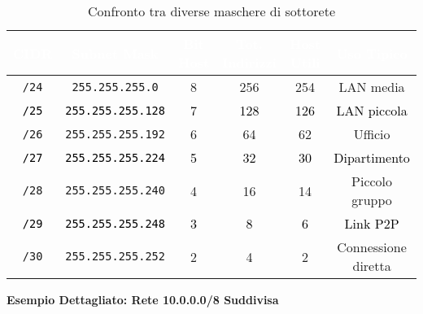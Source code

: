 \begin{table}[H]
\centering
\begin{tabular}{|c|c|c|c|c|c|}
\hline
\rowcolor{bg_custom}
\textcolor{white}{\textbf{CIDR}} & \textcolor{white}{\textbf{Subnet Mask}} & \textcolor{white}{\textbf{Bit Host}} & \textcolor{white}{\textbf{Tot. Indirizzi}} & \textcolor{white}{\textbf{Host Utili}} & \textcolor{white}{\textbf{Uso Tipico}} \\
\hline
\texttt{/24} & \texttt{255.255.255.0} & 8 & 256 & 254 & LAN media \\
\hline
\rowcolor{retecolor!20}
\textcolor{black}{\texttt{/25}} & \textcolor{black}{\texttt{255.255.255.128}} & \textcolor{black}{7} & \textcolor{black}{128} & \textcolor{black}{126} & \textcolor{black}{LAN piccola} \\
\hline
\texttt{/26} & \texttt{255.255.255.192} & 6 & 64 & 62 & Ufficio \\
\hline
\rowcolor{hostcolor!20}
\textcolor{black}{\texttt{/27}} & \textcolor{black}{\texttt{255.255.255.224}} & \textcolor{black}{5} & \textcolor{black}{32} & \textcolor{black}{30} & \textcolor{black}{Dipartimento} \\
\hline
\texttt{/28} & \texttt{255.255.255.240} & 4 & 16 & 14 & Piccolo gruppo \\
\hline
\rowcolor{retecolor!20}
\textcolor{black}{\texttt{/29}} & \textcolor{black}{\texttt{255.255.255.248}} & \textcolor{black}{3} & \textcolor{black}{8} & \textcolor{black}{6} & \textcolor{black}{Link P2P} \\
\hline
\texttt{/30} & \texttt{255.255.255.252} & 2 & 4 & 2 & Connessione diretta \\
\hline
\end{tabular}
\caption{Confronto tra diverse maschere di sottorete}
\end{table}

\vspace{1em}

\textbf{Esempio Dettagliato: Rete 10.0.0.0/8 Suddivisa}

